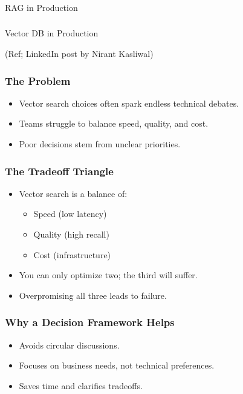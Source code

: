 \begin{frame}[fragile]\frametitle{}
\begin{center}
{\Large RAG in Production}
\end{center}
\end{frame}


\begin{frame}[fragile]\frametitle{}
\begin{center}
{\Large Vector DB in Production}

{\tiny (Ref; LinkedIn post by Nirant Kasliwal)}
\end{center}
\end{frame}


\begin{frame}[fragile]\frametitle{The Problem}
\begin{itemize}
    \item Vector search choices often spark endless technical debates.
    \item Teams struggle to balance speed, quality, and cost.
    \item Poor decisions stem from unclear priorities.
\end{itemize}
\end{frame}

\begin{frame}[fragile]\frametitle{The Tradeoff Triangle}
\begin{itemize}
    \item Vector search is a balance of:
    \begin{itemize}
        \item Speed (low latency)
        \item Quality (high recall)
        \item Cost (infrastructure)
    \end{itemize}
    \item You can only optimize two; the third will suffer.
    \item Overpromising all three leads to failure.
\end{itemize}
\end{frame}

\begin{frame}[fragile]\frametitle{Why a Decision Framework Helps}
\begin{itemize}
    \item Avoids circular discussions.
    \item Focuses on business needs, not technical preferences.
    \item Saves time and clarifies tradeoffs.
\end{itemize}
\end{frame}

